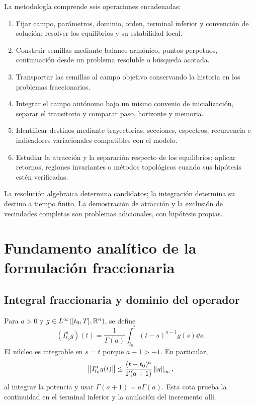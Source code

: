 La metodología comprende seis operaciones encadenadas:
\begin{enumerate}
 \item Fijar campo, parámetros, dominio, orden, terminal inferior y
 convención de solución; resolver los equilibrios y su estabilidad local.
 \item Construir semillas mediante balance armónico, puntos perpetuos,
 continuación desde un problema resoluble o búsqueda acotada.
 \item Transportar las semillas al campo objetivo conservando la historia
 en los problemas fraccionarios.
 \item Integrar el campo autónomo bajo un mismo convenio de inicialización,
 separar el transitorio y comparar paso, horizonte y memoria.
 \item Identificar destinos mediante trayectorias, secciones, espectros,
 recurrencia e indicadores variacionales compatibles con el modelo.
 \item Estudiar la atracción y la separación respecto de los equilibrios;
 aplicar retornos, regiones invariantes o métodos topológicos cuando sus
 hipótesis estén verificadas.
\end{enumerate}
La resolución algebraica determina candidatos; la integración determina
su destino a tiempo finito. La demostración de atracción y la exclusión de
vecindades completas son problemas adicionales, con hipótesis propias.

\section{Fundamento analítico de la formulación fraccionaria}
\label{bre:fund:caputo}

\subsection{Integral fraccionaria y dominio del operador}

Para $a>0$ y $g\in L^\infty([t_0,T],\mathbb R^n)$, se define
\begin{equation}
 (I_{t_0}^a g)(t)=\frac1{\Gamma(a)}
 \int_{t_0}^{t}(t-s)^{a-1}g(s)\dd s.
 \label{bre:fund:integral}
\end{equation}
El núcleo es integrable en $s=t$ porque $a-1>-1$. En particular,
\begin{equation}
 \left\lVert I_{t_0}^a g(t)\right\rVert\le
 \frac{(t-t_0)^a}{\Gamma(a+1)}\left\lVert g\right\rVert_\infty,
 \label{bre:fund:integralbound}
\end{equation}
al integrar la potencia y usar $\Gamma(a+1)=a\Gamma(a)$.
Esta cota prueba la continuidad en el terminal inferior y la anulación
del incremento allí.


